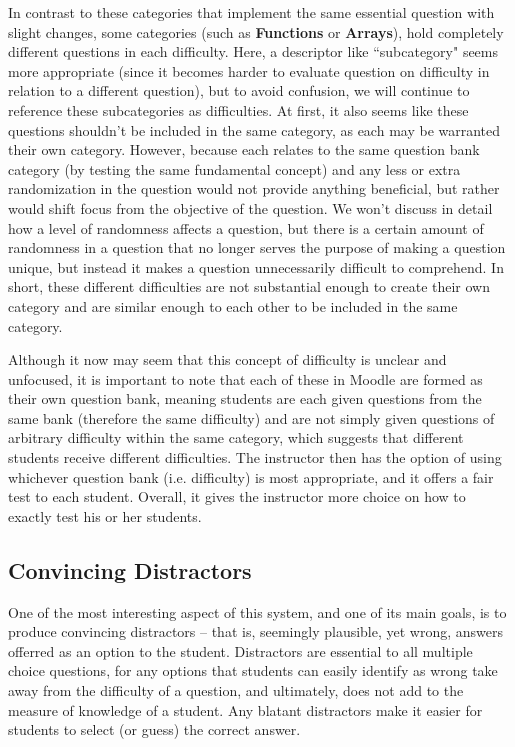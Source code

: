 \documentclass{article}
\begin{document}
In contrast to these categories that implement the same essential question with slight changes, some categories (such as \textbf{Functions}
or \textbf{Arrays}), hold completely different questions in each difficulty. Here, a descriptor like ``subcategory" seems more appropriate
(since it becomes harder to evaluate question on difficulty in relation to a different question), but
to avoid confusion, we will continue to reference these subcategories as difficulties. At first, it also seems like these questions shouldn't
be included in the same category, as each may be warranted their own category. However, because each relates to the same question bank category
(by testing the same fundamental concept) and any less or extra randomization in the question would not provide anything beneficial, but rather would shift focus from the objective of the question. We won't discuss in detail how a level of randomness affects
a question, but there is a certain amount of randomness in a question that no longer serves the purpose of making a question unique,
but instead it makes a question unnecessarily difficult to comprehend. In short, these different difficulties are not substantial enough to
create their own category and are similar enough to each other to be included in the same category.

Although it now may seem that this concept of difficulty is unclear and unfocused, it is important to note that each of these in Moodle are
formed as their own question bank, meaning students are each given questions from the same bank (therefore the same difficulty) and are not simply given questions of arbitrary difficulty within the same category, which suggests that different students receive different difficulties. The instructor then has the option of using whichever question bank (i.e. difficulty) is most appropriate,
and it offers a fair test to each student. Overall, it gives the instructor more choice on how to exactly test his or her students.

\subsection{Convincing Distractors} \label{sec-convincing_distractors}

One of the most interesting aspect of this system, and one of its main goals, is to produce convincing distractors -- that is, seemingly plausible, yet wrong, answers offerred as an option to the student. Distractors
are essential to all multiple choice questions, for any options that students can easily identify as wrong take away from the difficulty of a question, and ultimately, does not add to the measure of knowledge of a student. Any blatant distractors make it easier for students to select (or guess) the correct answer. 
\end{document}
